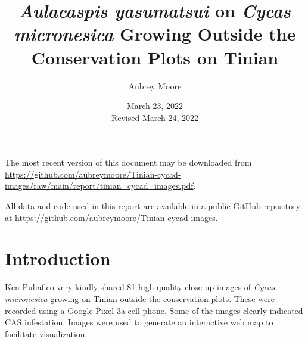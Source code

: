 \documentclass[12pt,letterpaper,english,bibliography=totocnumbered, abstract=on]{scrartcl}
\begin{document}
\titlehead{Technical Report}

\title{\textit{Aulacaspis yasumatsui} on \textit{Cycas micronesica} Growing Outside the Conservation Plots on Tinian}

\author{Aubrey Moore}

\date{March 23, 2022\\Revised March 24, 2022}

\maketitle
\newpage
\tableofcontents

\pagebreak

The most recent version of this document may be downloaded from \url{https://github.com/aubreymoore/Tinian-cycad-images/raw/main/report/tinian_cycad_images.pdf}.

All data and code used in this report are available in a public GitHub repository at
\url{https://github.com/aubreymoore/Tinian-cycad-images}.

\section{Introduction}

Ken Puliafico very kindly shared 81 high quality close-up images of \textit{Cycas micronesica} growing on Tinian outside the conservation plots. These were recorded using a Google Pixel 3a cell phone. Some of the images clearly indicated CAS infestation. Images were used to generate an interactive web map to facilitate visualization. 
\end{document}
